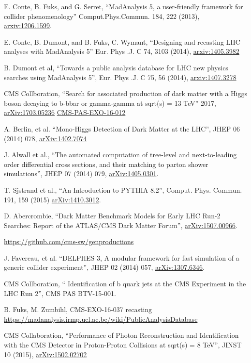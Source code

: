 \documentclass[12pt,A4paper]{article}
\begin{document}
\begin{thebibliography}{5}\vspace{-7pt}

 E. Conte, B. Fuks, and G. Serret, ``MadAnalysis 5, a user-friendly framework for collider phenomenology'' Comput.Phys.Commun. 184, 222 (2013), \href{https://arxiv.org/abs/1206.1599}{arxiv:1206.1599}.

 E. Conte, B. Dumont, and B. Fuks, C. Wymant, ``Designing and recasting LHC analyses with MadAnalysis 5''
Eur. Phys .J. C 74, 3103 (2014), \href{https://arxiv.org/abs/1405.3982}{arxiv:1405.3982}

 B. Dumont et al, ``Towards a public analysis database for LHC new physics searches using MadAnalysis 5'', Eur. Phys .J. C 75, 56 (2014), \href{https://arxiv.org/abs/1407.3278}{arxiv:1407.3278}

 CMS Collboration, ``Search for associated production of dark matter with a Higgs boson decaying to b-bbar or gamma-gamma at sqrt(s) = 13 TeV'' 2017, \href{https://arxiv.org/abs/1703.05236}{arXiv:1703.05236} \href{http://cms-results.web.cern.ch/cms-results/public-results/publications/EXO-16-012/}{CMS-PAS-EXO-16-012}

 A. Berlin, et al. ``Mono-Higgs Detection of Dark Matter at the LHC'', JHEP 06 (2014) 078, \href{https://arxiv.org/abs/1402.7074}{arXiv:1402.7074}

 J. Alwall et al., ``The automated computation of tree-level and next-to-leading order differential cross sections, and their matching to parton shower simulations'', JHEP 07 (2014) 079, \href{https://arxiv.org/abs/1405.0301}{arXiv:1405.0301}.

 T. Sjstrand et al., ``An Introduction to PYTHIA 8.2'', Comput. Phys. Commun. 191, 159 (2015) \href{https://arxiv.org/abs/1410.3012}{arXiv:1410.3012}.

 D. Abercrombie, ``Dark Matter Benchmark Models for Early LHC Run-2 Searches: Report of the ATLAS/CMS Dark Matter Forum'', \href{https://arxiv.org/abs/1507.00966}{arXiv:1507.00966}.

 \url{https://github.com/cms-sw/genproductions}

 J. Favereau, et al. ``DELPHES 3, A modular framework for fast simulation of a generic collider experiment'', JHEP 02 (2014) 057, \href{https://arxiv.org/abs/1307.6346}{arXiv:1307.6346}.

 CMS Collboration, ``
Identification of b quark jets at the CMS Experiment in the LHC Run 2'', CMS PAS BTV-15-001.


 B. Fuks, M. Zumbihl, CMS-EXO-16-037 recasting \url{https://madanalysis.irmp.ucl.ac.be/wiki/PublicAnalysisDatabase}

 CMS Collaboration, ``Performance of Photon Reconstruction and Identification with the CMS Detector in Proton-Proton Collisions at sqrt(s) = 8 TeV'', JINST 10 (2015), \href{https://arxiv.org/abs/1502.02702}{arXiv:1502.02702}

\end{thebibliography}
\end{document}
